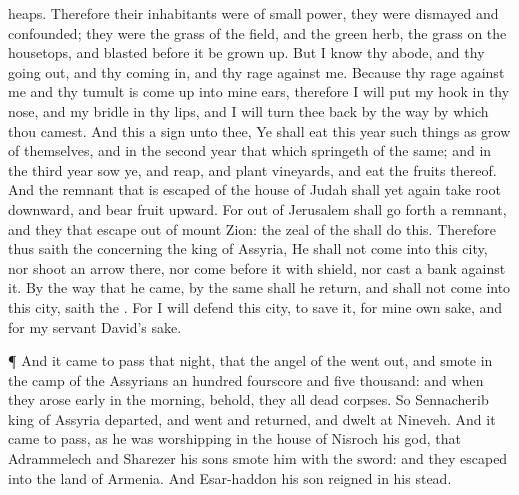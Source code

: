 {heaps.
Therefore their
inhabitants were of
small
power, they were
dismayed and
confounded; they were
{} the
grass of the
field, and
{} the
green
herb,
{} the
grass on the
housetops, and
{}
blasted
before it be grown
up.
But I
know thy
abode, and thy going
out, and thy coming
in, and thy
rage against me.
Because thy
rage against me and thy
tumult is come
up into mine
ears, therefore I will
put my
hook in thy
nose, and my
bridle in thy
lips, and I will turn thee
back by the
way by which thou
camest.
And this
{} a
sign unto thee, Ye shall
eat this
year such things as
grow of themselves, and in the
second
year that which
springeth of the same; and in the
third
year
sow ye, and
reap, and
plant
vineyards, and
eat the
fruits thereof.
And the
remnant that is
escaped of the
house of
Judah shall yet
again take
root
downward, and
bear
fruit
upward.
For out of
Jerusalem shall go
forth a
remnant, and they that
escape out of
mount
Zion: the
zeal of the
{}
{} shall
do this.
Therefore thus
saith the
{} concerning the
king of
Assyria, He shall not
come into this
city, nor
shoot an
arrow there, nor come
before it with
shield, nor
cast a
bank against it.
By the
way that he
came, by the same shall he
return, and shall not
come into this
city,
saith the
{}.
For I will
defend this
city, to
save it, for mine own sake, and for my
servant
David’s sake.
\par }{\PP {}¶ And it came to pass that
night, that the
angel of the
{} went
out, and
smote in the
camp of the
Assyrians an
hundred
fourscore and
five
thousand: and when they arose
early in the
morning, behold, they
{} all
dead
corpses.
So
Sennacherib
king of
Assyria
departed, and
went and
returned, and
dwelt at
Nineveh.
And it came to pass, as he was
worshipping in the
house of
Nisroch his
god, that
Adrammelech and
Sharezer his
sons
smote him with the
sword: and they
escaped into the
land of
Armenia. And
Esar-haddon his
son
reigned in his stead.

}
